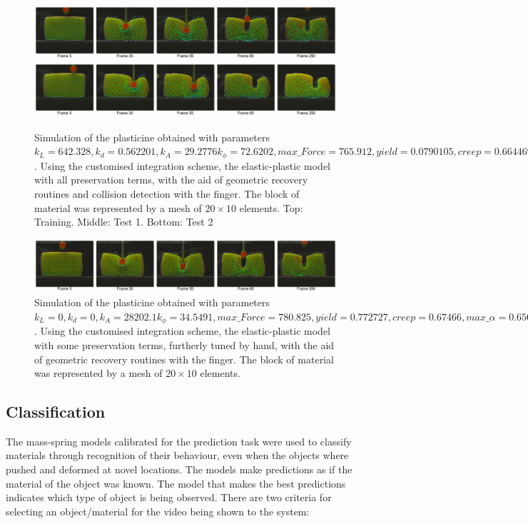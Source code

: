 \documentclass[journal]{IEEEtran}
\newcommand{\comment}[1]{{\color{red} #1}}
\begin{document}
\begin{figure}[!t]
\centering
\includegraphics[width=178mm]{arrio12}
\includegraphics[width=178mm]{arrio13}
\caption{Simulation of the plasticine obtained with parameters $k_L=642.328, k_d=0.562201, k_A=29.2776 k_{\phi}=72.6202, max\_Force=765.912, yield=0.0790105, creep=0.664469, max\_\alpha=0.48842$.  Using the customised integration scheme, the elastic-plastic model with all preservation terms, with the aid of geometric recovery routines and collision detection with the finger.  The block of material was represented by a mesh of $20 \times 10$ elements. Top: Training. Middle: Test 1. Bottom: Test 2}\label{fig:simulation_plasticine}
\end{figure}

\begin{figure}[!t]
\centering
\includegraphics[width=178mm]{arrio16}
\caption{Simulation of the plasticine obtained with parameters $k_L=0, k_d=0, k_A=28202.1 k_{\phi}=34.5491, max\_Force=780.825, yield=0.772727, creep=0.67466, max\_\alpha=0.656572$.  Using the customised integration scheme, the elastic-plastic model with some preservation terms, furtherly tuned by hand,  with the aid of geometric recovery routines with the finger.  The block of material was represented by a mesh of $20 \times 10$ elements.}\label{fig:simulation_plasticine_hand}
\end{figure}

\subsection{Classification}

The mass-spring models \comment{calibrated for the prediction task} were used to classify \comment{materials} through recognition of their behaviour, even \comment{when the objects where pushed and deformed at novel locations.}  The models make predictions as if the \comment{material of the} object was known.  The model that makes the best predictions indicates which \comment{type of} object is being observed.  There are two criteria for selecting an \comment{object/material for the video being shown to the system}:
\end{document}
